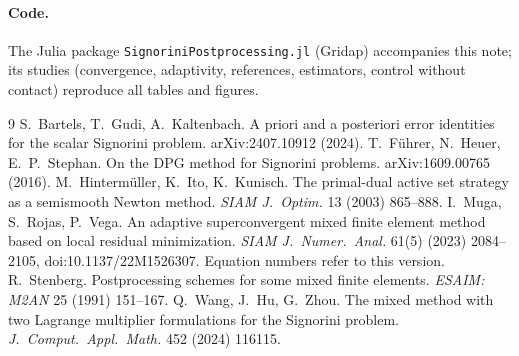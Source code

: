 \documentclass[11pt,a4paper]{article}
\theoremstyle{definition}
\begin{document}
\paragraph{Code.} The Julia package \texttt{SignoriniPostprocessing.jl} (Gridap) accompanies this
note; its studies (convergence, adaptivity, references, estimators, control without contact)
reproduce all tables and figures.

\begin{thebibliography}{9}
 S.~Bartels, T.~Gudi, A.~Kaltenbach. A priori and a posteriori error identities for
  the scalar Signorini problem. arXiv:2407.10912 (2024).
 T.~Führer, N.~Heuer, E.~P.~Stephan. On the DPG method for Signorini problems.
  arXiv:1609.00765 (2016).
 M.~Hintermüller, K.~Ito, K.~Kunisch. The primal-dual active set strategy as a
  semismooth Newton method. \emph{SIAM J.\ Optim.} 13 (2003) 865--888.
 I.~Muga, S.~Rojas, P.~Vega. An adaptive superconvergent mixed finite element method
  based on local residual minimization. \emph{SIAM J.\ Numer.\ Anal.} 61(5) (2023) 2084--2105,
  doi:10.1137/22M1526307. Equation numbers refer to this version.
 R.~Stenberg. Postprocessing schemes for some mixed finite elements.
  \emph{ESAIM: M2AN} 25 (1991) 151--167.
 Q.~Wang, J.~Hu, G.~Zhou. The mixed method with two Lagrange multiplier formulations
  for the Signorini problem. \emph{J.\ Comput.\ Appl.\ Math.} 452 (2024) 116115.
\end{thebibliography}
\end{document}

